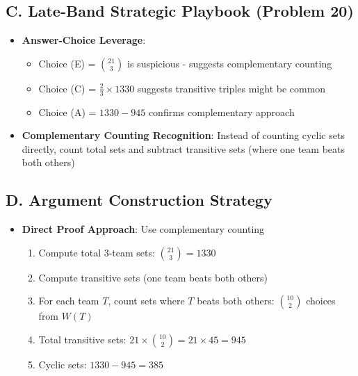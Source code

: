 \documentclass[]{article}
\begin{document}
\begin{strategicbox}
\subsection*{C. Late-Band Strategic Playbook (Problem 20)}
\begin{itemize}[leftmargin=*]
    \item \textbf{Answer-Choice Leverage}: 
    \begin{itemize}
        \item Choice (E) = $\binom{21}{3}$ is suspicious - suggests complementary counting
        \item Choice (C) = $\frac{2}{3} \times 1330$ suggests transitive triples might be common
        \item Choice (A) = $1330 - 945$ confirms complementary approach
    \end{itemize}
    \item \textbf{Complementary Counting Recognition}: Instead of counting cyclic sets directly, count total sets and subtract transitive sets (where one team beats both others)
\end{itemize}

\subsection*{D. Argument Construction Strategy}
\begin{itemize}[leftmargin=*]
    \item \textbf{Direct Proof Approach}: Use complementary counting
    \begin{enumerate}
        \item Compute total 3-team sets: $\binom{21}{3} = 1330$
        \item Compute transitive sets (one team beats both others)
        \item For each team $T$, count sets where $T$ beats both others: $\binom{10}{2}$ choices from $W(T)$
        \item Total transitive sets: $21 \times \binom{10}{2} = 21 \times 45 = 945$
        \item Cyclic sets: $1330 - 945 = 385$
    \end{enumerate}
\end{itemize}
\end{strategicbox}
\end{document}
